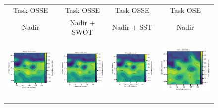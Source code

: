 \begin{figure}[ht!]
\small
\begin{center}
\setlength{\tabcolsep}{1pt}
\begin{tabular}{cccc}
\hspace{3mm} Task OSSE & 
\hspace{3mm} Task OSSE & 
\hspace{2mm} Task OSSE & 
Task OSE \\
\hspace{3mm}  Nadir & 
\hspace{3mm} Nadir + SWOT & 
\hspace{2mm} Nadir + SST & 
Nadir \\
\includegraphics[trim={0 13mm 22mm 0},clip, width=3.60cm,height=3.2cm]{content/figures/fourdvarnet_figs/osse_gf_nadir_ssh.png} &
\includegraphics[trim={13mm 13mm 22mm 0},clip, width=3.2cm,height=3.2cm]{content/figures/fourdvarnet_figs/osse_gf_nadirswot_ssh.png} &
\includegraphics[trim={13mm 13mm 22mm 0},clip, width=3.2cm,height=3.2cm]{content/figures/fourdvarnet_figs/osse_gf_nadir_sst_ssh.png} &
\includegraphics[trim={13mm 13mm 0 0},clip,width=4.0cm,height=3.2cm]{content/figures/fourdvarnet_figs/ose_gf_ssh.png} \\

\end{tabular}
\end{center}
\end{figure}
